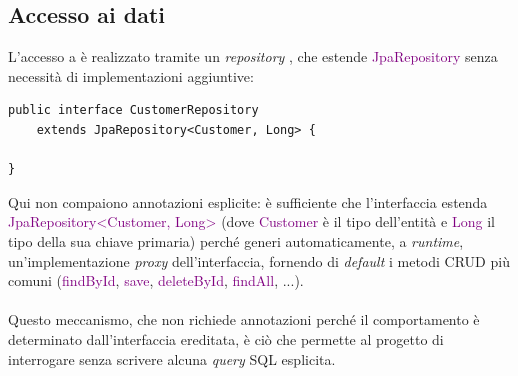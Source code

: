 \subsection{Accesso ai dati}
L'accesso a  è realizzato tramite un \textit{repository} , che estende \textcolor{purple}{JpaRepository} senza necessità di implementazioni aggiuntive:
\begin{codelisting}[H]
\begin{verbatim}
public interface CustomerRepository 
    extends JpaRepository<Customer, Long> {
    
}
\end{verbatim}
\caption{CustomerRepository}
\end{codelisting}
\noindent
Qui non compaiono annotazioni esplicite: è sufficiente che l'interfaccia estenda \textcolor{purple}{JpaRepository<Customer, Long>} (dove \textcolor{purple}{Customer} è il tipo dell'entità e \textcolor{purple}{Long} il tipo della sua chiave primaria) perché  generi automaticamente, a \textit{runtime}, un'implementazione \textit{proxy} dell'interfaccia, fornendo di \textit{default} i metodi \acrshort{CRUD} più comuni (\textcolor{purple}{findById}, \textcolor{purple}{save}, \textcolor{purple}{deleteById}, \textcolor{purple}{findAll}, ...). \\ \\
Questo meccanismo, che non richiede annotazioni perché il comportamento è determinato dall'interfaccia ereditata, è ciò che permette al progetto di interrogare  senza scrivere alcuna \textit{query} \acrshort{SQL} esplicita.

\newpage
